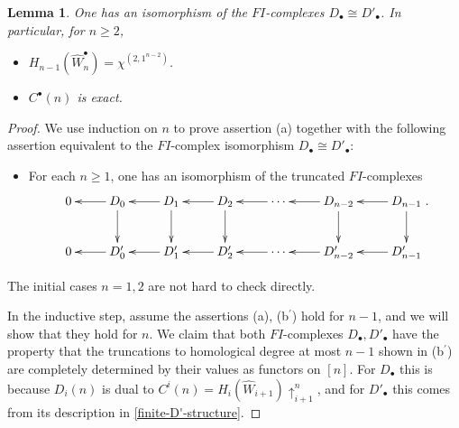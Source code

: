 \documentclass[12pt]{amsart}
\theoremstyle{plain}
\newtheorem{lem}[thm]{Lemma}
\theoremstyle{definition}
\begin{document}
\begin{lem}
\label{key-inductive-exactness-lemma}
One has an isomorphism of the 
$FI$-complexes $D_\bullet \cong D'_\bullet$.  In particular,
for $n \geq 2$,
\begin{itemize}
\item[(a)] $H_{n-1}(\hat{W}_n^\bullet) = \chi^{(2,1^{n-2})}$. 
\item[(b)] $C^\bullet(n)$ is exact.
\end{itemize}
\end{lem}
\begin{proof}
We use induction on $n$ to prove 
assertion (a) together with the following assertion equivalent to the 
$FI$-complex isomorphism $D_\bullet \cong D'_\bullet$:
\begin{itemize}
\item[(b${}^\prime$)]
For each $n \ge 1$, one has an isomorphism of the truncated $FI$-complexes
$$
\xymatrix{
0 &D_0 \ar[l] \ar[d] &D_1 \ar[l] \ar[d] & D_2 \ar[l] \ar[d] & 
  \cdots \ar[l]  & D_{n-2} \ar[l] \ar[d] & D_{n-1} \ar[l] \ar[d] \\
0 &D'_0 \ar[l]&D'_1 \ar[l]& D'_2 \ar[l]& 
  \cdots \ar[l] & D'_{n-2} \ar[l] & D'_{n-1} \ar[l]\\
}.
$$
\end{itemize}
The initial cases $n=1,2$ are not hard to check directly.

In the inductive step, assume the assertions (a), (b${}^\prime$) 
hold for $n-1$, and we will show that they hold for $n$.
We claim that both $FI$-complexes $D_\bullet, D'_\bullet$
have the property that the truncations 
to homological degree at most $n-1$ shown in
(b${}^\prime$) are completely determined by their values as
functors on $[n]$.  For $D_\bullet$ this is because
$D_i(n)$ is dual to $C^i(n)=H_i(\hat{W}_{i+1})\uparrow_{i+1}^{n}$,
and for $D'_\bullet$ this comes from its description in 
\eqref{finite-D'-structure}.


\end{proof}
\end{document}
